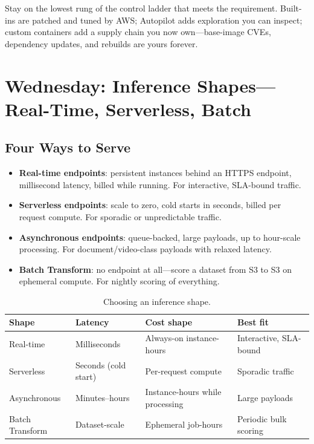 \begin{tipbox}
Stay on the lowest rung of the control ladder that meets the requirement. Built-ins are patched and tuned by AWS; Autopilot adds exploration you can inspect; custom containers add a supply chain you now own---base-image CVEs, dependency updates, and rebuilds are yours forever.
\end{tipbox}

\section{Wednesday: Inference Shapes---Real-Time, Serverless, Batch}
\subsection{Four Ways to Serve}
\begin{itemize}
    \item \textbf{Real-time endpoints}: persistent instances behind an HTTPS endpoint, millisecond latency, billed while running. For interactive, SLA-bound traffic.
    \item \textbf{Serverless endpoints}: scale to zero, cold starts in seconds, billed per request compute. For sporadic or unpredictable traffic.
    \item \textbf{Asynchronous endpoints}: queue-backed, large payloads, up to hour-scale processing. For document/video-class payloads with relaxed latency.
    \item \textbf{Batch Transform}: no endpoint at all---score a dataset from S3 to S3 on ephemeral compute. For nightly scoring of everything.
\end{itemize}

\begin{table}[H]
\centering
\small
\begin{tabular}{@{}p{3.0cm}p{3.6cm}p{3.4cm}p{3.2cm}@{}}
\toprule
\textbf{Shape} & \textbf{Latency} & \textbf{Cost shape} & \textbf{Best fit} \\
\midrule
Real-time & Milliseconds & Always-on instance-hours & Interactive, SLA-bound \\
Serverless & Seconds (cold start) & Per-request compute & Sporadic traffic \\
Asynchronous & Minutes--hours & Instance-hours while processing & Large payloads \\
Batch Transform & Dataset-scale & Ephemeral job-hours & Periodic bulk scoring \\
\bottomrule
\end{tabular}
\caption{Choosing an inference shape.}
\label{tab:ch18-inference}
\end{table}

